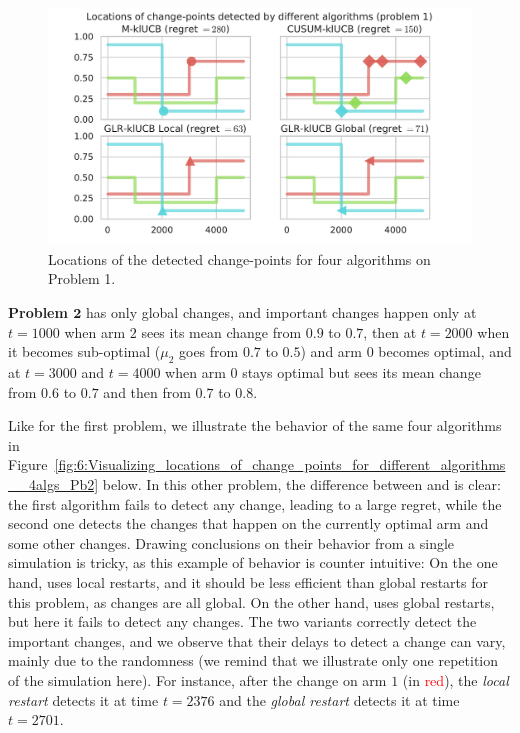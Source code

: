 \begin{figure}[h!]  %
    \centering
    \includegraphics[width=0.90\linewidth]{2-Chapters/6-Chapter/Images/Visualizing_locations_of_change_points_for_different_algorithms__4algs_Pb1.pdf}
    \caption{Locations of the detected change-points for four algorithms on Problem 1.}
    \label{fig:6:Visualizing_locations_of_change_points_for_different_algorithms__4algs_Pb1}
\end{figure}


\textbf{Problem $\bm{2}$} has only global changes, and important changes happen only at $t=1000$ when arm $2$ sees its mean change from $0.9$ to $0.7$, then at $t=2000$ when it becomes sub-optimal ($\mu_2$ goes from $0.7$ to $0.5$) and arm $0$ becomes optimal, and at $t=3000$ and $t=4000$ when arm $0$ stays optimal but sees its mean change from $0.6$ to $0.7$ and then from $0.7$ to $0.8$.

Like for the first problem, we illustrate the behavior of the same four algorithms in Figure~\ref{fig:6:Visualizing_locations_of_change_points_for_different_algorithms__4algs_Pb2} below.
In this other problem, the difference between \MklUCB{} and \CUSUMklUCB{} is clear:
the first algorithm fails to detect any change, leading to a large regret,
while the second one detects the changes that happen on the currently optimal arm and some other changes.
Drawing conclusions on their behavior from a single simulation is tricky, as this example of behavior is counter intuitive:
On the one hand, \CUSUM{} uses local restarts, and it should be less efficient than global restarts for this problem, as changes are all global.
On the other hand, \MklUCB{} uses global restarts, but here it fails to detect any changes.
%
The two \GLRklUCB{} variants correctly detect the important changes, and we observe that their delays to detect a change can vary, mainly due to the randomness (we remind that we illustrate only one repetition of the simulation here).
For instance, after the change on arm $1$ (in \textcolor{red}{red}), the \emph{local restart} detects it at time $t=2376$ and the \emph{global restart} detects it at time $t=2701$.

